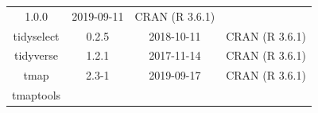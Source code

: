 \documentclass[11pt,]{book}
\begin{document}
\begin{longtable}[]{@{}cccc@{}}
\begin{minipage}[t]{0.19\columnwidth}
1.0.0\strut
\end{minipage} & \begin{minipage}[t]{0.16\columnwidth}\centering\strut
2019-09-11\strut
\end{minipage} & \begin{minipage}[t]{0.36\columnwidth}\centering\strut
CRAN (R 3.6.1)\strut
\end{minipage}\tabularnewline
\begin{minipage}[t]{0.18\columnwidth}\centering\strut
tidyselect\strut
\end{minipage} & \begin{minipage}[t]{0.19\columnwidth}\centering\strut
0.2.5\strut
\end{minipage} & \begin{minipage}[t]{0.16\columnwidth}\centering\strut
2018-10-11\strut
\end{minipage} & \begin{minipage}[t]{0.36\columnwidth}\centering\strut
CRAN (R 3.6.1)\strut
\end{minipage}\tabularnewline
\begin{minipage}[t]{0.18\columnwidth}\centering\strut
tidyverse\strut
\end{minipage} & \begin{minipage}[t]{0.19\columnwidth}\centering\strut
1.2.1\strut
\end{minipage} & \begin{minipage}[t]{0.16\columnwidth}\centering\strut
2017-11-14\strut
\end{minipage} & \begin{minipage}[t]{0.36\columnwidth}\centering\strut
CRAN (R 3.6.1)\strut
\end{minipage}\tabularnewline
\begin{minipage}[t]{0.18\columnwidth}\centering\strut
tmap\strut
\end{minipage} & \begin{minipage}[t]{0.19\columnwidth}\centering\strut
2.3-1\strut
\end{minipage} & \begin{minipage}[t]{0.16\columnwidth}\centering\strut
2019-09-17\strut
\end{minipage} & \begin{minipage}[t]{0.36\columnwidth}\centering\strut
CRAN (R 3.6.1)\strut
\end{minipage}\tabularnewline
\begin{minipage}[t]{0.18\columnwidth}\centering\strut
tmaptools\strut
\end{minipage} & \begin{minipage}[t]{0.19\columnwidth}\centering\strut

\end{minipage}
\end{longtable}
\end{document}
